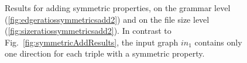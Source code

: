 \begin{figure}[h]
	\centering
	\hfill 
	\caption{Results for adding symmetric properties, on the grammar level (\ref{fig:edgeratiossymmetricsadd2}) and on the file size level (\ref{fig:sizeratiossymmetricsadd2}). In contrast to Fig.~\ref{fig:symmetricAddResults}, the input graph $in_1$ contains only one direction for each triple with a symmetric property.}
	\label{fig:symmetricAddResults2}
\end{figure}


